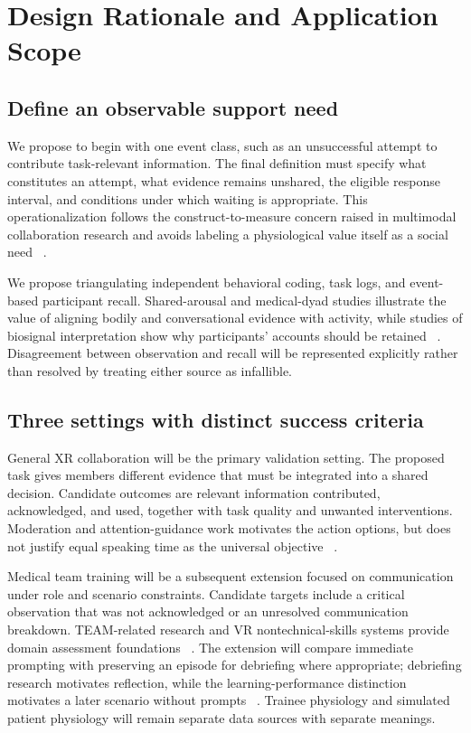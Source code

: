 \section{Design Rationale and Application Scope}
\label{sec:4}

\subsection{Define an observable support need}

We propose to begin with one event class, such as an unsuccessful attempt to contribute task-relevant information. The final definition must specify what constitutes an attempt, what evidence remains unshared, the eligible response interval, and conditions under which waiting is appropriate. This operationalization follows the construct-to-measure concern raised in multimodal collaboration research and avoids labeling a physiological value itself as a social need ~\cite{p57,p56}.


We propose triangulating independent behavioral coding, task logs, and event-based participant recall. Shared-arousal and medical-dyad studies illustrate the value of aligning bodily and conversational evidence with activity, while studies of biosignal interpretation show why participants' accounts should be retained ~\cite{p18,huang,p21}. Disagreement between observation and recall will be represented explicitly rather than resolved by treating either source as infallible.

\subsection{Three settings with distinct success criteria}

General XR collaboration will be the primary validation setting. The proposed task gives members different evidence that must be integrated into a shared decision. Candidate outcomes are relevant information contributed, acknowledged, and used, together with task quality and unwanted interventions. Moderation and attention-guidance work motivates the action options, but does not justify equal speaking time as the universal objective ~\cite{p70,p34}.

Medical team training will be a subsequent extension focused on communication under role and scenario constraints. Candidate targets include a critical observation that was not acknowledged or an unresolved communication breakdown. TEAM-related research and VR nontechnical-skills systems provide domain assessment foundations ~\cite{p13,p66,p4}. The extension will compare immediate prompting with preserving an episode for debriefing where appropriate; debriefing research motivates reflection, while the learning-performance distinction motivates a later scenario without prompts ~\cite{p9,p26,p62}. Trainee physiology and simulated patient physiology will remain separate data sources with separate meanings.

